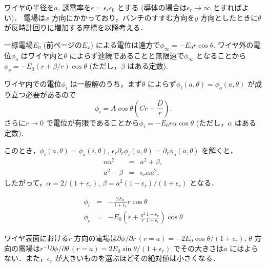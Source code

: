 \documentclass{jsarticle}
\begin{document}
ワイヤの半径を$a$, 誘電率を$\epsilon = \epsilon_r \epsilon_0$ とする (導体の場合は$\epsilon_r\to\infty$ とすればよい)．
電場は$x$ 方向にかかっており，バンチのすすむ方向を$y$ 方向としたときに$\theta$ が反時計回りに増加する座標を以降考える．

一様電場$E_0$ (前ページの$E_x$) による電位は遠方で$\phi_\infty = -E_0r\cos\theta$.
ワイヤ外の電位$\phi_o$ はワイヤ内と$\theta$ によらず連続であることと無限遠で$\phi_\infty$ となることから$\phi_o = -E_0(r + \beta/r)\cos\theta$ (ただし，$\beta$ はある定数).

ワイヤ内での電位$\phi_i$ は一般解のうち，まず$\theta$ によらず$\phi_i(a,\theta) = \phi_o(a,\theta)$ が成り立つ必要があるので
\begin{equation}
\phi_i = A\cos\theta (Cr + \frac{D}{r}).
\end{equation}
さらに$r\to 0$ で電位が有限であることから$\phi_i = -E_0r\alpha\cos\theta$ (ただし，$\alpha$ はある定数).


このとき，$\phi_i(a,\theta) = \phi_o(i,\theta)$, $\epsilon_r\partial_r\phi_i(a, \theta) = \partial_r\phi_o(a, \theta)$ を解くと，
\begin{eqnarray}
\alpha a^2 &=& a^2 + \beta, \\
a^2 - \beta &=& \epsilon_r \alpha a^2.
\end{eqnarray}
したがって，$\alpha = 2/(1+\epsilon_r)$, $\beta = a^2(1-\epsilon_r)/(1+\epsilon_r)$ となる．

\begin{eqnarray}
\phi_i &=& - \frac{2 E_0}{1+\epsilon_r} r \cos\theta \\ 
\phi_o &=& -E_0\left(r + \frac{a^2}{r}\frac{1-\epsilon_r}{1+\epsilon_r}\right) \cos\theta
\end{eqnarray}

ワイヤ表面における$r$ 方向の電場は$\partial\phi/\partial r\,(r = a) = -2E_0\cos\theta/(1+\epsilon_r)$, $\theta$ 方向の電場は$r^{-1}\partial\phi/\partial\theta\,(r = a) = 2E_0\sin\theta/(1+\epsilon_r)$ でその大きさは$a$ にはよらない．また，$\epsilon_r$ が大きいものを選ぶほどその絶対値は小さくなる．
\end{document}
